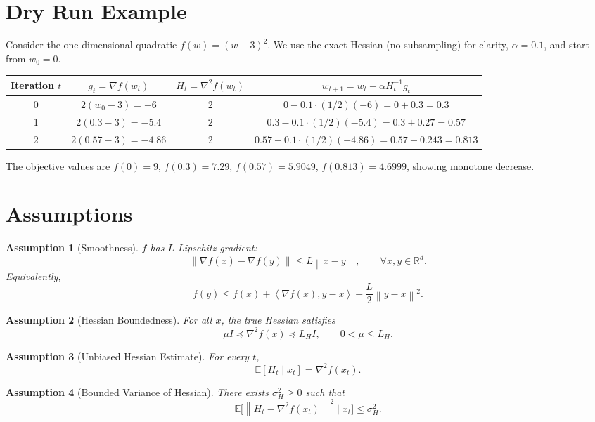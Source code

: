 \documentclass{article}
\newtheorem{assumption}{Assumption}
\newcommand{\E}{\mathbb{E}}
\newcommand{\R}{\mathbb{R}}
\newcommand{\norm}[1]{\left\|#1\right\|}
\newcommand{\ip}[2]{\left\langle #1,#2\right\rangle}
\newcommand{\grad}{\nabla}
\begin{document}
\section*{Dry Run Example}
Consider the one‑dimensional quadratic $f(w)=(w-3)^2$.  
We use the exact Hessian (no subsampling) for clarity, $\alpha=0.1$, and start from $w_0=0$.

\begin{center}
\begin{tabular}{c|c|c|c}
Iteration $t$ & $g_t=\grad f(w_t)$ & $H_t=\nabla^2 f(w_t)$ & $w_{t+1}=w_t-\alpha H_t^{-1}g_t$\\\hline
0 & $2(w_0-3)=-6$ & $2$ & $0-0.1\cdot(1/2)(-6)=0+0.3=0.3$\\
1 & $2(0.3-3)=-5.4$ & $2$ & $0.3-0.1\cdot(1/2)(-5.4)=0.3+0.27=0.57$\\
2 & $2(0.57-3)=-4.86$ & $2$ & $0.57-0.1\cdot(1/2)(-4.86)=0.57+0.243=0.813$\\
\end{tabular}
\end{center}

The objective values are $f(0)=9$, $f(0.3)=7.29$, $f(0.57)=5.9049$, $f(0.813)=4.6999$, showing monotone decrease.

\newpage
\section*{Assumptions}
\begin{assumption}[Smoothness]\label{as:smooth}
$f$ has $L$‑Lipschitz gradient:
\[
    \norm{\grad f(x)-\grad f(y)}\le L\norm{x-y},\qquad\forall x,y\in\R^d .
\]
Equivalently,
\[
    f(y)\le f(x)+\ip{\grad f(x)}{y-x}+\frac{L}{2}\norm{y-x}^2 .
\tag{2}
\]
\end{assumption}

\begin{assumption}[Hessian Boundedness]\label{as:hessbound}
For all $x$, the true Hessian satisfies
\[
    \mu I \preceq \nabla^2 f(x) \preceq L_H I ,
\qquad 0<\mu\le L_H .
\tag{3}
\]
\end{assumption}

\begin{assumption}[Unbiased Hessian Estimate]\label{as:unbiased}
For every $t$,
\[
    \E[H_t\mid x_t]=\nabla^2 f(x_t) .
\tag{4}
\]
\end{assumption}

\begin{assumption}[Bounded Variance of Hessian]\label{as:var}
There exists $\sigma_H^2\ge0$ such that
\[
    \E\big[\norm{H_t-\nabla^2 f(x_t)}^2\mid x_t\big]\le\sigma_H^2 .
\tag{5}
\]
\end{assumption}
\end{document}
